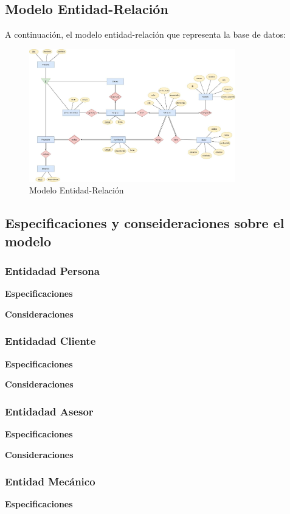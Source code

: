 \documentclass[12pt]{article}
\begin{document}
\subsection{Modelo Entidad-Relaci\'on}

A continuación, el modelo entidad-relación que representa la base de datos:

\begin{figure}
\centering
\includegraphics[width=0.8\textwidth]{ER.jpg}
\caption{Modelo Entidad-Relación}
\end{figure}

\subsection{Especificaciones y conseideraciones sobre el modelo}

\subsubsection{Entidadad Persona}
\textbf{Especificaciones}

\textbf{Consideraciones}

\subsubsection{Entidadad Cliente}
\textbf{Especificaciones}

\textbf{Consideraciones}

\subsubsection{Entidadad Asesor}
\textbf{Especificaciones}

\textbf{Consideraciones}

\subsubsection{Entidad Mecánico}
\textbf{Especificaciones}
\end{document}
